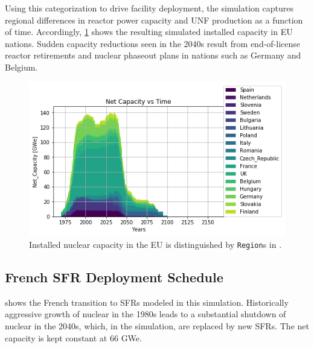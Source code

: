 \begin{table}[h]
\begin{tabular}{lll}
        \end{tabular}

Using this categorization to drive facility deployment, the simulation captures 
regional differences in reactor power capacity and \gls{UNF} production as a 
function of time. Accordingly, \cref{fig:eu_pow} shows the resulting simulated 
installed capacity in \gls{EU} nations.  Sudden capacity reductions seen in the 
2040s result from end-of-license reactor retirements and nuclear phaseout plans 
in nations such as Germany and Belgium.  
    
  \label{tab:eu_growth}
\end{table}
\FloatBarrier

\begin{figure}[htbp!]
    \begin{center}
        \includegraphics[scale=0.6]{./images/eu_future/power_plot.png}
    \end{center}
    \caption{Installed nuclear capacity in the EU is distinguished by \texttt{Region}s in \Cyclus.}
    \label{fig:eu_pow}
\end{figure}


\subsection{French \gls{SFR} Deployment Schedule}

shows
the French transition to \glspl{SFR} modeled in this simulation.
Historically aggressive growth of nuclear in the 1980s leads to a substantial 
shutdown of nuclear in the 2040s, which, in the simulation, are replaced by new 
\glspl{SFR}. The net capacity is kept constant at 66 GWe.

